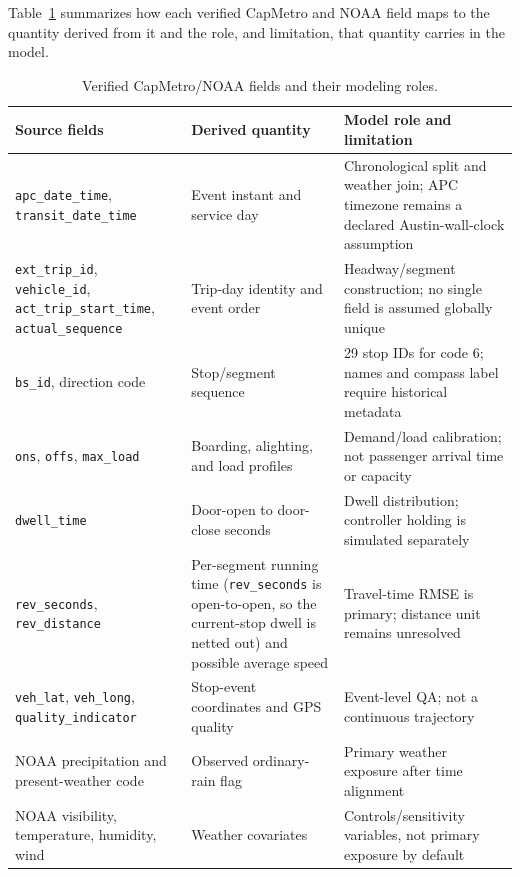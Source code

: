 Table~\ref{tab:field-mapping-texas} summarizes how each verified CapMetro and NOAA field maps to the quantity derived from it and the role, and limitation, that quantity carries in the model.

\begin{table}[htbp]
\centering
\caption{Verified CapMetro/NOAA fields and their modeling roles.}
\label{tab:field-mapping-texas}
\small
\renewcommand{\arraystretch}{1.2}
\begin{tabularx}{\textwidth}{p{}p{}X}
\toprule
\textbf{Source fields} & \textbf{Derived quantity} & \textbf{Model role and limitation} \\
\midrule
\texttt{apc\_date\_time}, \texttt{transit\_date\_time} & Event instant and service day & Chronological split and weather join; APC timezone remains a declared Austin-wall-clock assumption \\
\texttt{ext\_trip\_id}, \texttt{vehicle\_id}, \texttt{act\_trip\_start\_time}, \texttt{actual\_sequence} & Trip-day identity and event order & Headway/segment construction; no single field is assumed globally unique \\
\texttt{bs\_id}, direction code & Stop/segment sequence & 29 stop IDs for code 6; names and compass label require historical metadata \\
\texttt{ons}, \texttt{offs}, \texttt{max\_load} & Boarding, alighting, and load profiles & Demand/load calibration; not passenger arrival time or capacity \\
\texttt{dwell\_time} & Door-open to door-close seconds & Dwell distribution; controller holding is simulated separately \\
\texttt{rev\_seconds}, \texttt{rev\_distance} & Per-segment running time (\texttt{rev\_seconds} is open-to-open, so the current-stop dwell is netted out) and possible average speed & Travel-time RMSE is primary; distance unit remains unresolved \\
\texttt{veh\_lat}, \texttt{veh\_long}, \texttt{quality\_indicator} & Stop-event coordinates and GPS quality & Event-level QA; not a continuous trajectory \\
NOAA precipitation and present-weather code & Observed ordinary-rain flag & Primary weather exposure after time alignment \\
NOAA visibility, temperature, humidity, wind & Weather covariates & Controls/sensitivity variables, not primary exposure by default \\
\bottomrule
\end{tabularx}
\end{table}

